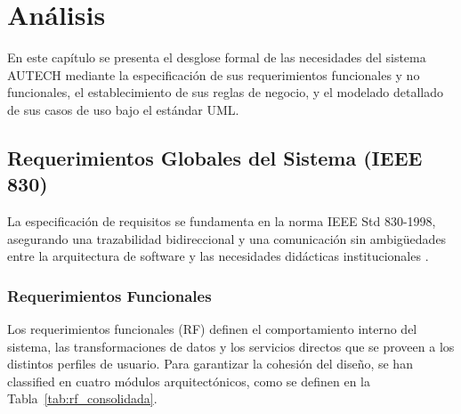 \vspace*{-4cm}
\chapter{Análisis}
\label{ch:analisis}

En este capítulo se presenta el desglose formal de las necesidades del sistema AUTECH mediante la especificación de sus requerimientos funcionales y no funcionales, el establecimiento de sus reglas de negocio, y el modelado detallado de sus casos de uso bajo el estándar UML.

\section{Requerimientos Globales del Sistema (IEEE 830)}
\label{sec:ieee830}

La especificación de requisitos se fundamenta en la norma IEEE Std 830-1998, asegurando una trazabilidad bidireccional y una comunicación sin ambigüedades entre la arquitectura de software y las necesidades didácticas institucionales \cite{ieee1998}.

\subsection{Requerimientos Funcionales}
\label{subsec:req_funcionales}

Los requerimientos funcionales (RF) definen el comportamiento interno del sistema, las transformaciones de datos y los servicios directos que se proveen a los distintos perfiles de usuario. Para garantizar la cohesión del diseño, se han classified en cuatro módulos arquitectónicos, como se definen en la Tabla~\ref{tab:rf_consolidada}.

